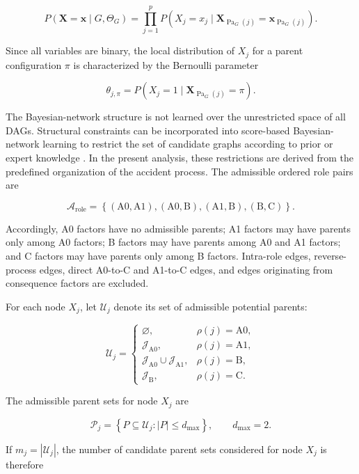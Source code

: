 \[
P(\mathbf X=\mathbf x\mid G,\Theta_G)
=
\prod_{j=1}^{p}
P\left(
X_j=x_j
\mid
\mathbf X_{\operatorname{Pa}_G(j)}
=
\mathbf x_{\operatorname{Pa}_G(j)}
\right).
\]

Since all variables are binary, the local distribution of \(X_j\) for a
parent configuration \(\pi\) is characterized by the Bernoulli parameter

\[
\theta_{j,\pi}
=
P\left(
X_j=1
\mid
\mathbf X_{\operatorname{Pa}_G(j)}=\pi
\right).
\]

The Bayesian-network structure is not learned over the unrestricted space of
all DAGs. Structural constraints can be incorporated into score-based
Bayesian-network learning to restrict the set of candidate graphs according
to prior or expert knowledge
\citep{decampos2009structure,li2018constraints,
ramaswamy2022expertconstraints}. In the present analysis, these restrictions
are derived from the predefined organization of the accident process. The
admissible ordered role pairs are

\[
\mathcal A_{\mathrm{role}}
=
\left\{
(\mathrm{A0},\mathrm{A1}),
(\mathrm{A0},\mathrm{B}),
(\mathrm{A1},\mathrm{B}),
(\mathrm{B},\mathrm{C})
\right\}.
\]

Accordingly, A0 factors have no admissible parents; A1 factors may have
parents only among A0 factors; B factors may have parents among A0 and A1
factors; and C factors may have parents only among B factors. Intra-role
edges, reverse-process edges, direct A0-to-C and A1-to-C edges, and edges
originating from consequence factors are excluded.

For each node \(X_j\), let \(\mathcal U_j\) denote its set of admissible
potential parents:

\[
\mathcal U_j
=
\begin{cases}
\varnothing,
& \rho(j)=\mathrm{A0},
\\[0.3em]
\mathcal J_{\mathrm{A0}},
& \rho(j)=\mathrm{A1},
\\[0.3em]
\mathcal J_{\mathrm{A0}}\cup\mathcal J_{\mathrm{A1}},
& \rho(j)=\mathrm{B},
\\[0.3em]
\mathcal J_{\mathrm{B}},
& \rho(j)=\mathrm{C}.
\end{cases}
\]

The admissible parent sets for node \(X_j\) are

\[
\mathcal P_j
=
\left\{
P\subseteq\mathcal U_j:
|P|\leq d_{\max}
\right\},
\qquad
d_{\max}=2.
\]

If \(m_j=|\mathcal U_j|\), the number of candidate parent sets considered for
node \(X_j\) is therefore

